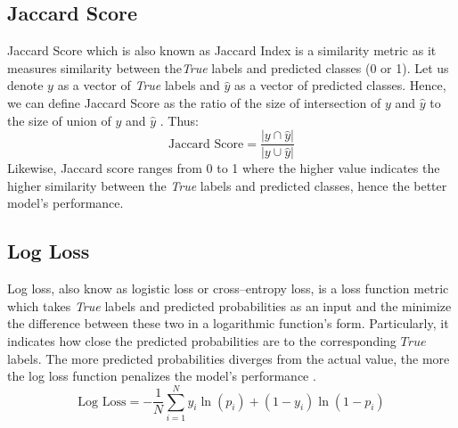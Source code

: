 \subsection{Jaccard Score}
Jaccard Score which is also known as Jaccard Index is a similarity metric as it measures similarity between the\textit{True} labels and predicted classes (0 or 1).
Let us denote $y$ as a vector of \textit{True} labels and $\hat{y}$ as a vector of predicted classes.
Hence, we can define Jaccard Score as the ratio of the size of intersection of $y$ and $\hat{y}$ to the size of union of $y$ and $\hat{y}$ \citep{leskovec2020mining}. Thus:
\begin{equation}\label{eq}
    \text{Jaccard Score} = \frac{|y \cap \hat{y} |}{|y \cup \hat{y} |}
\end{equation}
Likewise, Jaccard score ranges from 0 to 1 where the higher value indicates the higher similarity between the \textit{True} labels and predicted classes, hence the better model's performance.


\subsection{Log Loss}

Log loss, also know as logistic loss or cross--entropy loss, is a loss function metric which takes \textit{True} labels and predicted probabilities as an input and the minimize the difference between these two in a logarithmic function's form. Particularly, it indicates how close the predicted probabilities are to the corresponding $True$ labels. The more predicted probabilities diverges from the actual value, the more the log loss function penalizes the model's performance \citep{dembla2020intuition}.
\begin{equation}\label{eq}
    \text{Log Loss}  = -\frac{1}{N} \sum_{i=1}^{N} y_i \ln(p_i) + (1-y_i)\ln(1-p_i)
\end{equation}


